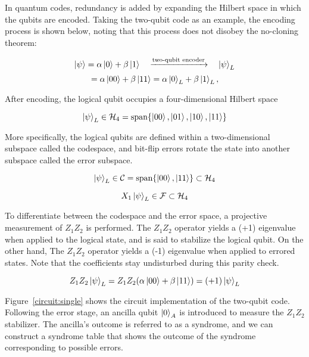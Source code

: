 In quantum codes, redundancy is added by expanding the Hilbert space in which the qubits are encoded. Taking the two-qubit code as an example, the encoding process is shown below, noting that this process does not disobey the no-cloning theorem:

\[
    \ket{\psi} = \alpha \ket{0} + \beta \ket{1}
    \quad
    \xrightarrow{\text{two-qubit encoder}}
    \quad
    \ket{\psi}_L
\]
\[
    = \alpha \ket{00} + \beta \ket{11} = \alpha \ket{0}_L + \beta \ket{1}_L,
\]

After encoding, the logical qubit occupies a four-dimensional Hilbert space

\[
    \ket{\psi}_L \in \mathcal{H}_4 = \text{span}\{\ket{00}, \ket{01}, \ket{10}, \ket{11}\}
\]

More specifically, the logical qubits are defined within a two-dimensional subspace called the codespace, and bit-flip errors rotate the state into another subspace called the error subspace.

\[
    \ket{\psi}_L \in \mathcal{C} = \text{span}\{\ket{00}, \ket{11}\} \subset \mathcal{H}_4
\]

\[
    X_1 \ket{\psi}_L \in \mathcal{F} \subset \mathcal{H}_4
\]

To differentiate between the codespace and the error space, a projective measurement of $Z_1Z_2$ is performed. The $Z_1Z_2$ operator yields a (+1) eigenvalue when applied to the logical state, and is said to stabilize the logical qubit. On the other hand, The $Z_1Z_2$ operator yields a (-1) eigenvalue when applied to errored states. Note that the coefficients stay undisturbed during this parity check.

\[
    Z_1Z_2\ket{\psi}_L = Z_1Z_2(\alpha \ket{00} + \beta \ket{11}) = (+1) \ket{\psi}_L
\]

Figure~\ref{circuit:single} shows the circuit implementation of the two-qubit code. Following the error stage, an ancilla qubit $\ket{0}_A$ is introduced to measure the $Z_1Z_2$ stabilizer. The ancilla's outcome is referred to as a syndrome, and we can construct a syndrome table that shows the outcome of the syndrome corresponding to possible errors.

